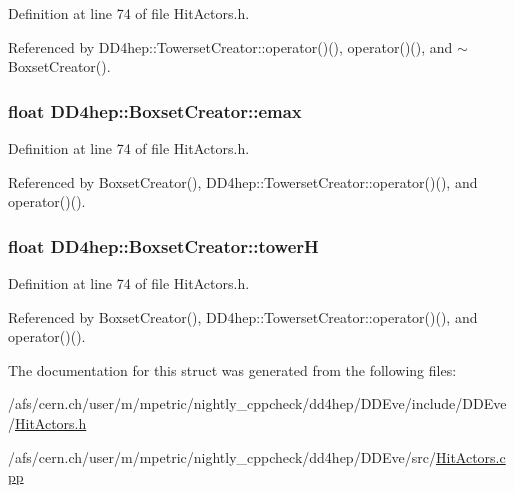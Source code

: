 Definition at line 74 of file HitActors.h.

Referenced by DD4hep::TowersetCreator::operator()(), operator()(), and $\sim$BoxsetCreator().\hypertarget{struct_d_d4hep_1_1_boxset_creator_a8be1434aa1149653df8e8b3677971dbe}{
\subsubsection[{emax}]{\setlength{\rightskip}{0pt plus 5cm}float {\bf DD4hep::BoxsetCreator::emax}}}
\label{struct_d_d4hep_1_1_boxset_creator_a8be1434aa1149653df8e8b3677971dbe}


Definition at line 74 of file HitActors.h.

Referenced by BoxsetCreator(), DD4hep::TowersetCreator::operator()(), and operator()().\hypertarget{struct_d_d4hep_1_1_boxset_creator_a5a4d59452a3be79b9fd59911eb5b555c}{
\subsubsection[{towerH}]{\setlength{\rightskip}{0pt plus 5cm}float {\bf DD4hep::BoxsetCreator::towerH}}}
\label{struct_d_d4hep_1_1_boxset_creator_a5a4d59452a3be79b9fd59911eb5b555c}


Definition at line 74 of file HitActors.h.

Referenced by BoxsetCreator(), DD4hep::TowersetCreator::operator()(), and operator()().

The documentation for this struct was generated from the following files:\begin{DoxyCompactItemize}
\item 
/afs/cern.ch/user/m/mpetric/nightly\_\-cppcheck/dd4hep/DDEve/include/DDEve/\hyperlink{_hit_actors_8h}{HitActors.h}\item 
/afs/cern.ch/user/m/mpetric/nightly\_\-cppcheck/dd4hep/DDEve/src/\hyperlink{_hit_actors_8cpp}{HitActors.cpp}\end{DoxyCompactItemize}

